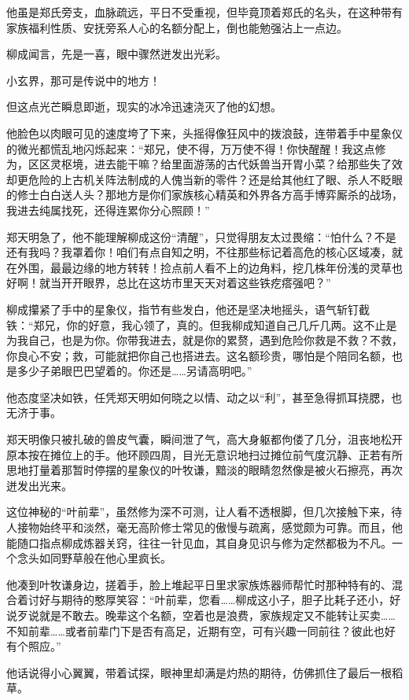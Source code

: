 他虽是郑氏旁支，血脉疏远，平日不受重视，但毕竟顶着郑氏的名头，在这种带有家族福利性质、安抚旁系人心的名额分配上，倒也能勉强沾上一点边。

柳成闻言，先是一喜，眼中骤然迸发出光彩。

小玄界，那可是传说中的地方！

但这点光芒瞬息即逝，现实的冰冷迅速浇灭了他的幻想。

他脸色以肉眼可见的速度垮了下来，头摇得像狂风中的拨浪鼓，连带着手中星象仪的微光都慌乱地闪烁起来：“郑兄，使不得，万万使不得！你快醒醒！我这点修为，区区灵枢境，进去能干嘛？给里面游荡的古代妖兽当开胃小菜？给那些失了效却更危险的上古机关阵法制成的人傀当新的零件？还是给其他红了眼、杀人不眨眼的修士白白送人头？那地方是你们家族核心精英和外界各方高手博弈厮杀的战场，我进去纯属找死，还得连累你分心照顾！”

郑天明急了，他不能理解柳成这份“清醒”，只觉得朋友太过畏缩：“怕什么？不是还有我吗？我罩着你！咱们有点自知之明，不往那些标记着高危的核心区域凑，就在外围，最最边缘的地方转转！捡点前人看不上的边角料，挖几株年份浅的灵草也好啊！就当开开眼界，总比在这坊市里天天对着这些铁疙瘩强吧？”

柳成攥紧了手中的星象仪，指节有些发白，他还是坚决地摇头，语气斩钉截铁：“郑兄，你的好意，我心领了，真的。但我柳成知道自己几斤几两。这不止是为我自己，也是为你。你带我进去，就是你的累赘，遇到危险你救是不救？不救，你良心不安；救，可能就把你自己也搭进去。这名额珍贵，哪怕是个陪同名额，也是多少子弟眼巴巴望着的。你还是……另请高明吧。”

他态度坚决如铁，任凭郑天明如何晓之以情、动之以“利”，甚至急得抓耳挠腮，也无济于事。

郑天明像只被扎破的兽皮气囊，瞬间泄了气，高大身躯都佝偻了几分，沮丧地松开原本按在摊位上的手。他环顾四周，目光无意识地扫过摊位前气度沉静、正若有所思地打量着那暂时停摆的星象仪的叶牧谦，黯淡的眼睛忽然像是被火石擦亮，再次迸发出光来。

这位神秘的“叶前辈”，虽然修为深不可测，让人看不透根脚，但几次接触下来，待人接物始终平和淡然，毫无高阶修士常见的傲慢与疏离，感觉颇为可靠。而且，他能随口指点柳成炼器关窍，往往一针见血，其自身见识与修为定然都极为不凡。一个念头如同野草般在他心里疯长。

他凑到叶牧谦身边，搓着手，脸上堆起平日里求家族炼器师帮忙时那种特有的、混合着讨好与期待的憨厚笑容：“叶前辈，您看……柳成这小子，胆子比耗子还小，好说歹说就是不敢去。晚辈这个名额，空着也是浪费，家族规定又不能转让买卖……不知前辈……或者前辈门下是否有高足，近期有空，可有兴趣一同前往？彼此也好有个照应。”

他话说得小心翼翼，带着试探，眼神里却满是灼热的期待，仿佛抓住了最后一根稻草。

